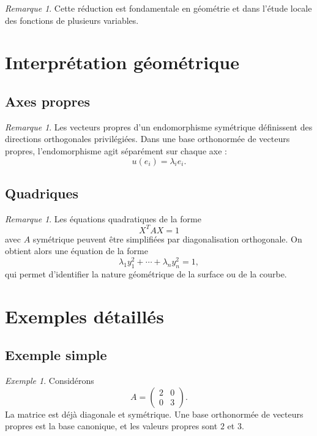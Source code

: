 \documentclass[11pt,a4paper]{article}
\theoremstyle{remark}
\newtheorem{remarque}[definition]{Remarque}
\newtheorem{exemple}[definition]{Exemple}
\begin{document}
\begin{remarque}
Cette réduction est fondamentale en géométrie et dans l’étude locale des fonctions de plusieurs variables.
\end{remarque}

\section{Interprétation géométrique}

\subsection{Axes propres}

\begin{remarque}
Les vecteurs propres d’un endomorphisme symétrique définissent des directions orthogonales privilégiées.  
Dans une base orthonormée de vecteurs propres, l’endomorphisme agit séparément sur chaque axe :
\[
u(e_i)=\lambda_i e_i.
\]
\end{remarque}

\subsection{Quadriques}

\begin{remarque}
Les équations quadratiques de la forme
\[
X^TAX=1
\]
avec \(A\) symétrique peuvent être simplifiées par diagonalisation orthogonale. On obtient alors une équation de la forme
\[
\lambda_1 y_1^2+\cdots+\lambda_n y_n^2=1,
\]
qui permet d’identifier la nature géométrique de la surface ou de la courbe.
\end{remarque}

\section{Exemples détaillés}

\subsection{Exemple simple}

\begin{exemple}
Considérons
\[
A=
\begin{pmatrix}
2 & 0\\
0 & 3
\end{pmatrix}.
\]
La matrice est déjà diagonale et symétrique. Une base orthonormée de vecteurs propres est la base canonique, et les valeurs propres sont \(2\) et \(3\).
\end{exemple}
\end{document}
